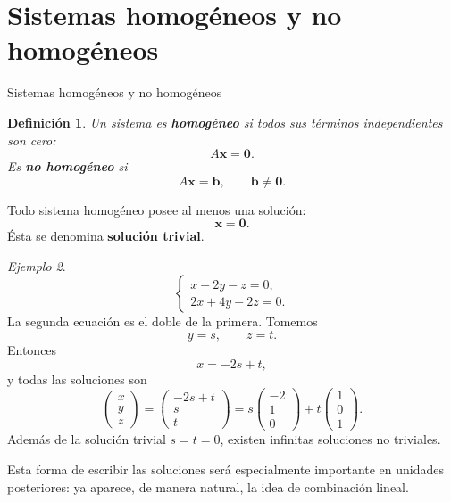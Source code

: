 \documentclass[aspectratio=169,9pt]{beamer}
\newtheorem{definicion}{Definición}[section]
\theoremstyle{remark}
\newtheorem{ejemplo}[definicion]{Ejemplo}
\begin{document}
\section{Sistemas homogéneos y no homogéneos}
\begin{frame}[allowframebreaks,t]{Sistemas homogéneos y no homogéneos}
\begin{definicion}
Un sistema es \textbf{homogéneo} si todos sus términos independientes son cero:
\[
A\mathbf{x}=\mathbf{0}.
\]
Es \textbf{no homogéneo} si
\[
A\mathbf{x}=\mathbf{b},\qquad \mathbf b\neq\mathbf0.
\]
\end{definicion}

Todo sistema homogéneo posee al menos una solución:
\[
\mathbf{x}=\mathbf0.
\]
Ésta se denomina \textbf{solución trivial}.

\begin{ejemplo}
\[
\begin{cases}
x+2y-z=0,\\
2x+4y-2z=0.
\end{cases}
\]
La segunda ecuación es el doble de la primera. Tomemos
\[
y=s,\qquad z=t.
\]
Entonces
\[
x=-2s+t,
\]
y todas las soluciones son
\[
\begin{pmatrix}x\\y\\z\end{pmatrix}
=
\begin{pmatrix}-2s+t\\s\\t\end{pmatrix}
=
s\begin{pmatrix}-2\\1\\0\end{pmatrix}
+t\begin{pmatrix}1\\0\\1\end{pmatrix}.
\]
Además de la solución trivial $s=t=0$, existen infinitas soluciones no triviales.
\end{ejemplo}

Esta forma de escribir las soluciones será especialmente importante en unidades posteriores: ya
aparece, de manera natural, la idea de combinación lineal.
\end{frame}
\end{document}
